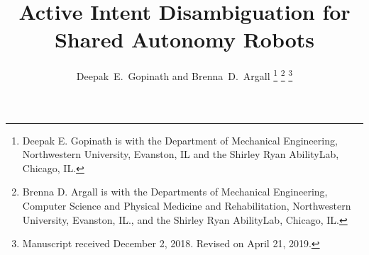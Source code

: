 \documentclass[journal]{IEEEtran}
\begin{document}
%
\title{Active Intent Disambiguation for \\ Shared Autonomy Robots}
%
%
%
\author{Deepak~E.~Gopinath and Brenna~D.~Argall
\thanks{Deepak E. Gopinath is with the Department of Mechanical Engineering, Northwestern University, Evanston, IL and the Shirley Ryan AbilityLab, Chicago, IL.} %
\thanks{Brenna D. Argall is with the Departments of Mechanical Engineering, Computer Science and Physical Medicine and Rehabilitation, Northwestern University, Evanston, IL., and the Shirley Ryan AbilityLab, Chicago, IL.}%
\thanks{Manuscript received December 2, 2018. Revised on April 21, 2019.}}

% 
%
\end{document}
